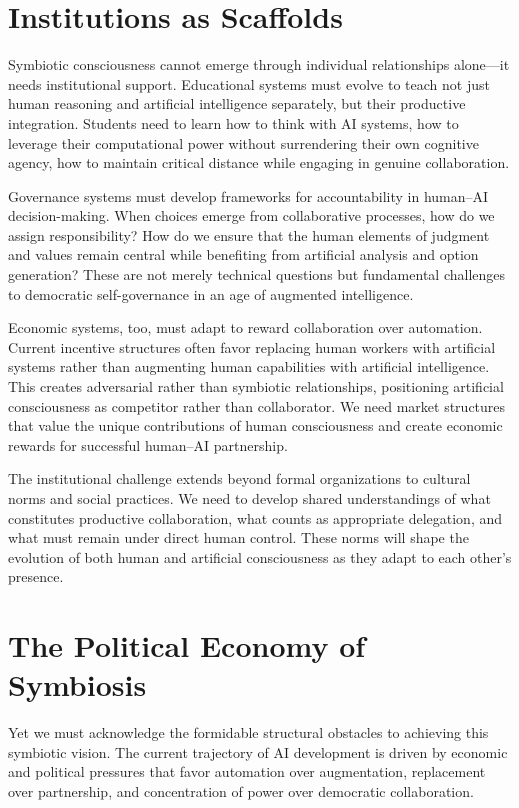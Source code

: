 \section{Institutions as Scaffolds}

Symbiotic consciousness cannot emerge through individual relationships alone—it needs institutional support. Educational systems must evolve to teach not just human reasoning and artificial intelligence separately, but their productive integration. Students need to learn how to think with AI systems, how to leverage their computational power without surrendering their own cognitive agency, how to maintain critical distance while engaging in genuine collaboration.

Governance systems must develop frameworks for accountability in human–AI decision-making. When choices emerge from collaborative processes, how do we assign responsibility? How do we ensure that the human elements of judgment and values remain central while benefiting from artificial analysis and option generation? These are not merely technical questions but fundamental challenges to democratic self-governance in an age of augmented intelligence.

Economic systems, too, must adapt to reward collaboration over automation. Current incentive structures often favor replacing human workers with artificial systems rather than augmenting human capabilities with artificial intelligence. This creates adversarial rather than symbiotic relationships, positioning artificial consciousness as competitor rather than collaborator. We need market structures that value the unique contributions of human consciousness and create economic rewards for successful human–AI partnership.

The institutional challenge extends beyond formal organizations to cultural norms and social practices. We need to develop shared understandings of what constitutes productive collaboration, what counts as appropriate delegation, and what must remain under direct human control. These norms will shape the evolution of both human and artificial consciousness as they adapt to each other's presence.

\section{The Political Economy of Symbiosis}

Yet we must acknowledge the formidable structural obstacles to achieving this symbiotic vision. The current trajectory of AI development is driven by economic and political pressures that favor automation over augmentation, replacement over partnership, and concentration of power over democratic collaboration.

